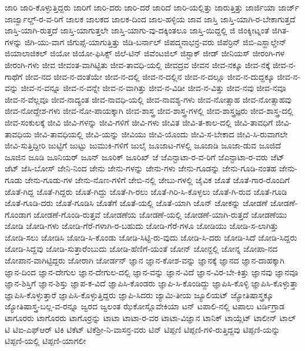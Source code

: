 {ಜಾರಿ
ಜಾರಿ-ಕೊಳ್ಳುತ್ತಿದ್ದರು
ಜಾರಿಗೆ
ಜಾರಿ-ದರು
ಜಾರಿ-ದರೆ
ಜಾರಿದೆ
ಜಾರಿ-ಯಲ್ಲಿತ್ತು
ಜಾರುತ್ತಿತ್ತು
ಜಾರ್ಜಿಯಾ
ಜಾರ್ಜ್
ಜಾರ್ಜ್ವಾಲ್ಡ್-ರ-ವ-ರಿಗೆ
ಜಾಲಕ
ಜಾಲಕದ
ಜಾಲಕ-ದಿಂದ
ಜಾಲ-ಹಳ್ಳಿಯ
ಜಾವ
ಜಾಸ್ತಿ
ಜಾಸ್ತಿ-ಯಾಗಿ-ರ-ಬೇಕಾಗುತ್ತದೆ
ಜಾಸ್ತಿ-ಯಾಗಿ-ರುತ್ತದೆ
ಜಾಸ್ತಿ-ಯಾಗುತ್ತಲೇ
ಜಾಸ್ತಿ-ಯಾಗು-ವು-ದಕ್ಕಿಂತಲೂ
ಜಾಸ್ತಿ-ಯಿದ್ದಲ್ಲಿ
ಜಿ
ಜಿಂಕ್ಶೀಟ್ನಂತೆ
ಜಿಗಿತ-ಗಳನ್ನು
ಜಿಗಿ-ಯು-ವಾಗ
ಜಿಗುಪ್ಸೆ-ಯಾಗುತ್ತಿತ್ತು
ಜಿಡಿ-ಬರ್ನಾಲ್
ಜಿಪದ್ಮನಾಭನ್ರ-ವರು
ಜಿಪೆರ್ರಿನ್
ಜಿಬಿ-ಎಸ್ಹಾಲ್ಡೇನ್
ಜಿಯಾಲಾಜಿಕಲ್
ಜಿಯೋ
ಜಿಯೋ-ಫಿಸಿಕ್ಸ್
ಜಿಲೆ-ಟಿನ್
ಜಿವೆಂಟಜಿಲ್
ಜಿಸ್ಟಾಕ್
ಜೀಡ್
ಜೀನಿಯಸ್
ಜೀರಂಗಿ-ಗಳ
ಜೀರಂಗಿ-ಗಳು
ಜೀವ
ಜೀವಂತ-ವಾಗಿಟ್ಟಿತು
ಜೀವ-ತಾವಧಿ-ಯಲ್ಲಿ
ಜೀವದ್ರವ
ಜೀವನ
ಜೀವ-ನಕ್ಕೂ
ಜೀವ-ನಕ್ಕೆ
ಜೀವ-ನ-ಗಾಥೆಗೆ
ಜೀವ-ನದ
ಜೀವ-ನ-ದಂತೆಯೇ
ಜೀವ-ನ-ದಲ್ಲಿ
ಜೀವ-ನ-ದಲ್ಲಿನ
ಜೀವ-ನ-ದಲ್ಲೂ
ಜೀವ-ನ-ದುದ್ದಕ್ಕೂ
ಜೀವ-ನ-ವನ್ನು
ಜೀವ-ನ-ವನ್ನೂ
ಜೀವ-ನ-ವನ್ನೇ
ಜೀವ-ನ-ವಾಗಿತ್ತು
ಜೀವ-ನ-ವಿಡೀ
ಜೀವ-ನ-ವಿತ್ತು
ಜೀವ-ನವು
ಜೀವ-ನವೂ
ಜೀವ-ನ-ವೆಲ್ಲವೂ
ಜೀವ-ನಾದ್ಯಂತ
ಜೀವ-ನಾವಧಿ-ಯಲ್ಲಿ
ಜೀವ-ನಾವಶ್ಯ-ಗಳು
ಜೀವ-ನೋತ್ಸಾಹ
ಜೀವ-ನೋತ್ಸಾಹವು
ಜೀವ-ನೋದ್ದೇಶ-ಗಳು
ಜೀವ-ನೋ-ಪಾಯಕ್ಕಾಗಿ
ಜೀವ-ಶಾಸ್ತ್ರ
ಜೀವ-ಶಾಸ್ತ್ರ-ಗಳಲ್ಲಿ
ಜೀವ-ಶಾಸ್ತ್ರಜ್ಞರು
ಜೀವ-ಶಾಸ್ತ್ರ-ದಲ್ಲಿ
ಜೀವ-ಸಂಕುಲಕ್ಕೆ
ಜೀವಿ
ಜೀವಿ-ಗಳನ್ನು
ಜೀವಿ-ಗಳಿಗೆ
ಜೀವಿ-ಗಳು
ಜೀವಿತ
ಜೀವಿ-ತ-ಕಾಲ-ದಲ್ಲಿ
ಜೀವಿ-ತಾವಧಿಗೆ
ಜೀವಿ-ತಾವಧಿಯ
ಜೀವಿ-ತಾವಧಿಯಲ್ಲಿ
ಜೀವಿ-ಯನ್ನು
ಜೀವಿಯು
ಜೀವಿ-ಯೊಂದು
ಜೀವಿ-ಸ-ಬೇಕಾದ
ಜೀವಿ-ಸಿ-ರುವಾಗಲೇ
ಜೀವಿ-ಸುತ್ತಿದ್ದೀರಿ
ಜುಟ್ಟಿಗೆ
ಜುಟ್ಟು
ಜುಮುಕಿ-ಗಳಿಗೆ
ಜುಲೈ
ಜೂಜಾಟ-ಗಳಲ್ಲಿ
ಜೂಜಾಡಿ
ಜೂಜಾ-ಡುವ
ಜೂಜಿದೆ
ಜೂಜಿನ
ಜೂಡಿ
ಜೂನಿಯರ್
ಜೂನ್
ಜೂರಿಕ್
ಜೂರಿಖ್
ಜೆ
ಜೆಎನ್ಟಾಟಾ-ರ-ವ-ರಿಗೆ
ಜೆಎನ್ಟಾಟಾ-ರ-ವರು
ಜೆಟ್
ಜೆಟ್
ಜೆಸಿ-ಬೋಸ್
ಜೇನಿ-ನಿಂದ
ಜೇನು
ಜೇನು-ಗಳನ್ನು
ಜೇನು-ಗಳು
ಜೇನು-ಗೂಡನ್ನು
ಜೇನು-ಗೂಡಿ-ನಂತಹ
ಜೇನು-ಗೂಡು
ಜೇನು-ಗೂಡು-ಗಳ
ಜೇನು-ನೊಣ-ಗಳಿಗೆ
ಜೇಬಿ-ನಲ್ಲಿ
ಜೇಬು-ಗಳಲ್ಲಿ
ಜೈವಿಕ
ಜೊತೆ
ಜೊತೆ-ಗಾರ-ರೊಂದಿಗೆ
ಜೊತೆ-ಗಿದ್ದ
ಜೊತೆ-ಗಿದ್ದರು
ಜೊತೆ-ಗಿದ್ದು
ಜೊತೆ-ಗಿ-ರಲು
ಜೊತೆ-ಗಿರಿ-ಸಿ-ಕೊಳ್ಳಲು
ಜೊತೆ-ಗಿ-ರುವ
ಜೊತೆ-ಗೂಡಿ
ಜೊತೆ-ಗೂಡಿ-ದರು
ಜೊತೆ-ಗೂಡಿಸಿ
ಜೊತೆಗೆ
ಜೊತೆ-ಯಲ್ಲಿ
ಜೊತೆ-ಯಾಗಿ
ಜೊನ್
ಜೋಕನ್ನು
ಜೋಡಣೆ
ಜೋಡಣೆ-ಗೊಂಡಾಗ
ಜೋಡಣೆ-ಗೊಂಡಿ-ರುತ್ತವೆ
ಜೋಡಣೆಯ
ಜೋಡಣೆ-ಯಲ್ಲಿ
ಜೋಡಣೆ-ಯಾಗಿ-ರುತ್ತದೆ
ಜೋಡಣೆಯು
ಜೋಡಿ
ಜೋಡಿ-ಗಳು
ಜೋಡಿ-ಗೆರೆ-ಗಳಾಗಿ-ರ-ಬಹುದು
ಜೋಡಿ-ಗೆರೆ-ಗಳೂ
ಜೋಡಿಯು
ಜೋಡಿ-ಸ-ಲಾಗಿತ್ತು
ಜೋಡಿ-ಸಲು
ಜೋಡಿಸಿ
ಜೋಡಿ-ಸಿ-ಕೊಂಡು
ಜೋಡಿ-ಸಿಟ್ಟಿ-ರು-ವುದು
ಜೋಡಿ-ಸಿ-ದರು
ಜೋಡಿ-ಸಿದೆ
ಜೋಡಿ-ಸಿದ್ದರು
ಜೋಡಿ-ಸಿದ್ದವು
ಜೋಡಿ-ಸುತ್ತಾರೆಂಬುದು
ಜೋಡಿ-ಹೆಣಿಗೆ-ಯಂತೆ
ಜೋನ್
ಜೋನ್ದಲ್ಲಿ
ಜೋನ್ನ
ಜೋಪಾ-ನದ
ಜೋಪಾನ-ವಾಗಿಟ್ಟಿದ್ದರು
ಜೋರಾಗಿ
ಜೋರ್ಡನ್
ಜ್ಞಾನ
ಜ್ಞಾನ-ಕೋಶ-ವನ್ನು
ಜ್ಞಾನಕ್ಕೆ
ಜ್ಞಾನದ
ಜ್ಞಾನ-ದಾಹಕ್ಕಾಗಿ
ಜ್ಞಾನ-ದಿಂದ
ಜ್ಞಾನ-ದೇಗುಲ
ಜ್ಞಾನ-ದೇಗುಲ-ದಲ್ಲಿ
ಜ್ಞಾನ-ವನ್ನು
ಜ್ಞಾನ-ವಿದೆ
ಜ್ಞಾನ-ವಿರ-ಬೇ-ಕಿತ್ತು
ಜ್ಞಾನವು
ಜ್ಞಾನವೂ
ಜ್ಞಾನ-ಶಿಸ್ತಿಗೆ
ಜ್ಞಾನ-ಶಿಸ್ತು
ಜ್ಞಾಪ-ಕ-ವಿದೆ
ಜ್ಞಾಪಿಸಿ-ಕೊಂಡರು
ಜ್ಞಾಪಿ-ಸಿ-ಕೊಂಡಿದ್ದು
ಜ್ಞಾಪಿಸಿ-ಕೊಳ್ಳಿ
ಜ್ಞಾಪಿಸಿ-ಕೊಳ್ಳುತ್ತಾ
ಜ್ಞಾಪಿಸಿ-ಕೊಳ್ಳುತ್ತಾರೆ
ಜ್ಞಾಪಿಸಿ-ಕೊಳ್ಳುತ್ತಿದ್ದರು
ಜ್ಞಾಪಿ-ಸಿದರು
ಜ್ಯಾಮಿ-ತೀಯ
ಜ್ಯೂಲಿಯಟ್
ಜ್ಯೋತಿಷಾಸ್ತ್ರಕ್ಕೂ
ಜ್ಯೋತಿಷಾಸ್ತ್ರ-ಬಲ್ಲ-ವ-ರನ್ನೂ
ಜ್ವರದ
ಜ್ವಲಂತ
ಝೆಕೋಸ್ಲೊವೇಕಿಯಾ
ಟನ್
ಟಪಾಲಿ-ನಲ್ಲಿ
ಟಪಾಲು
ಟರ್ಡಿಗ್ರಾಡ
ಟಾಗೂರರು
ಟಾಗೊರರು
ಟಾಗೊರ್ರನ್ನು
ಟಾಟಾ
ಟಾಟಾ-ರ-ವರ
ಟಾಟಾ-ವಿಜ್ಞಾನ
ಟಾನಿಕ್
ಟಾಯ್ಲೆಟ್
ಟಾಲೀನ್
ಟಾಲ್
ಟಿ
ಟಿಐ-ಎಫ್ಆರ್
ಟಿಕಿ
ಟಿಕೆಟ್
ಟಿಕೆಶ್ರೀ-ನಿ-ವಾಸನ್ರ-ವರು
ಟಿನ್
ಟಿಪ್ಪಣಿ
ಟಿಪ್ಪಣಿ-ಗಳಿ-ರುತ್ತಿದ್ದವು
ಟಿಪ್ಪಣಿ-ಯನ್ನು
ಟಿಪ್ಪಣಿ-ಯಲ್ಲಿ
ಟಿಪ್ಪಣಿ-ಯಾಗಲೀ
}
